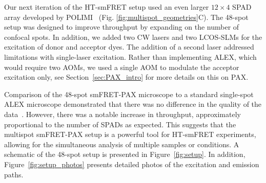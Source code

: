 Our next iteration of the \ac{HT-smFRET} setup used an even larger $12\times4$ \ac{SPAD} array developed by \ac{POLIMI}~\cite{gulinatti_SPIE_2012, ingargiola_JCP_2018} (Fig. \ref{fig:multispot_geometries}C). 
The 48-spot setup was designed to improve throughput by expanding on the number of confocal spots.
In addition, we added two \ac{CW} lasers and two \ac{LCOS-SLM}s for the excitation of donor and acceptor dyes.
The addition of a second laser addressed limitations with single-laser excitation.
Rather than implementing \ac{ALEX}, which would require two \ac{AOM}s, we used a single \ac{AOM} to modulate the acceptor excitation only, see Section~\ref{sec:PAX_intro} for more details on this on \ac{PAX}.

Comparison of the 48-spot smFRET-PAX microscope to a standard single-spot ALEX microscope demonstrated that there was no difference in the quality of the data~\cite{ingargiola_JCP_2018}. 
However, there was a notable increase in throughput, approximately proportional to the number of \ac{SPAD}s as expected. 
This suggests that the multispot smFRET-PAX setup is a powerful tool for \ac{HT-smFRET} experiments, allowing for the simultaneous analysis of multiple samples or conditions. 
A schematic of the 48-spot setup is presented in Figure~\ref{fig:setup}.
In addition, Figure~\ref{fig:setup_photos} presents detailed photos of the excitation and emission paths.

